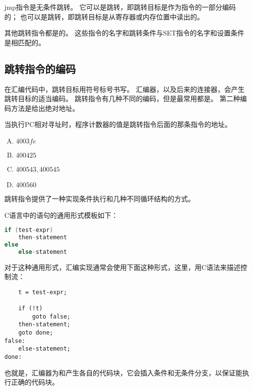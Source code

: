 {{        jmp指令是无条件跳转。
        它可以是跳转，即跳转目标是作为指令的一部分编码的；
        也可以是跳转，即跳转目标是从寄存器或内存位置中读出的。

        其他跳转指令都是的。
        这些指令的名字和跳转条件与SET指令的名字和设置条件是相匹配的。
    }

    \subsection{跳转指令的编码}
    {
        在汇编代码中，跳转目标用符号标号书写。
        汇编器，以及后来的连接器，会产生跳转目标的适当编码。
        跳转指令有几种不同的编码，但是最常用都是。
        第二种编码方法是给出绝对地址。

        当执行PC相对寻址时，程序计数器的值是跳转指令后面的那条指令的地址。

        \begin{practicec}
            \begin{enumerate}[A.]
                \item $4003fe$
                \item $400425$
                \item $400543, 400545$
                \item $400560$
            \end{enumerate}
        \end{practicec}

        跳转指令提供了一种实现条件执行和几种不同循环结构的方式。

        C语言中的语句的通用形式模板如下：

        \begin{lstlisting}[language=C]
if (test-expr)
    then-statement
else
    else-statement
        \end{lstlisting}

        对于这种通用形式，汇编实现通常会使用下面这种形式，这里，用C语法来描述控制流：

        \begin{lstlisting}
    t = test-expr;

    if (!t)
        goto false;
    then-statement;
    goto done;
false:
    else-statement;
done:
        \end{lstlisting}

        也就是，汇编器为和产生各自的代码块，它会插入条件和无条件分支，以保证能执行正确的代码块。

}}
